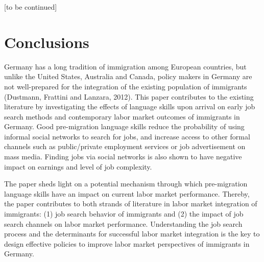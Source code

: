 \documentclass[12pt,a4paper]{article}
\begin{document}
\begin{center}
[to be continued]
\end{center} 

\section{Conclusions}

Germany has a long tradition of immigration among European countries, but unlike the United States, Australia and Canada, policy makers in Germany are not well-prepared for the integration of the existing population of immigrants (Dustmann, Frattini and Lanzara, 2012). This paper contributes to the existing literature by investigating the effects of language skills upon arrival on early job search methods and contemporary labor market outcomes of immigrants in Germany. Good pre-migration language skills reduce the probability of using informal social networks to search for jobs, and increase access to other formal channels such as public/private employment services or job advertisement on mass media. Finding jobs via social networks is also shown to have negative impact on earnings and level of job complexity.

The paper sheds light on a potential mechanism through which pre-migration language skills have an impact on current labor market performance. Thereby, the paper contributes to both strands of literature in labor market integration of immigrants: (1) job search behavior of immigrants and (2) the impact of job search channels on labor market performance. Understanding the job search process and the determinants for successful labor market integration is the key to design effective policies to improve labor market perspectives of immigrants in Germany.
\end{document}
